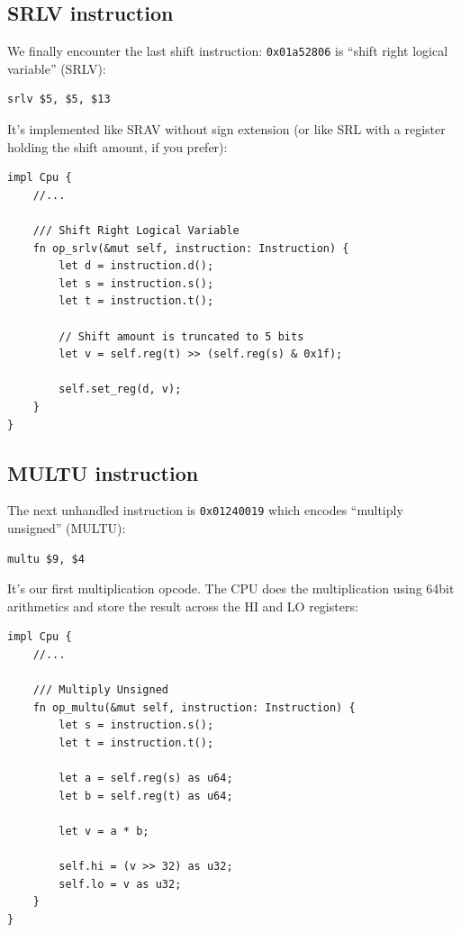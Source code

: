 \documentclass[a4paper]{article}
\newcommand{\code}[1] {\texttt{#1}}
\begin{document}
\subsection{SRLV instruction}

We finally encounter the last shift instruction: \code{0x01a52806} is
``shift right logical variable'' (SRLV):

\begin{lstlisting}[language=assembly]
srlv $5, $5, $13
\end{lstlisting}

It's implemented like SRAV without sign extension (or like SRL with a
register holding the shift amount, if you prefer):

\begin{lstlisting}
impl Cpu {
    //...

    /// Shift Right Logical Variable
    fn op_srlv(&mut self, instruction: Instruction) {
        let d = instruction.d();
        let s = instruction.s();
        let t = instruction.t();

        // Shift amount is truncated to 5 bits
        let v = self.reg(t) >> (self.reg(s) & 0x1f);

        self.set_reg(d, v);
    }
}
\end{lstlisting}

\subsection{MULTU instruction}

The next unhandled instruction is \code{0x01240019} which encodes
``multiply unsigned'' (MULTU):

\begin{lstlisting}[language=assembly]
multu $9, $4
\end{lstlisting}

It's our first multiplication opcode. The CPU does the multiplication
using 64bit arithmetics and store the result across the HI and LO
registers:

\begin{lstlisting}
impl Cpu {
    //...

    /// Multiply Unsigned
    fn op_multu(&mut self, instruction: Instruction) {
        let s = instruction.s();
        let t = instruction.t();

        let a = self.reg(s) as u64;
        let b = self.reg(t) as u64;

        let v = a * b;

        self.hi = (v >> 32) as u32;
        self.lo = v as u32;
    }
}
\end{lstlisting}
\end{document}
